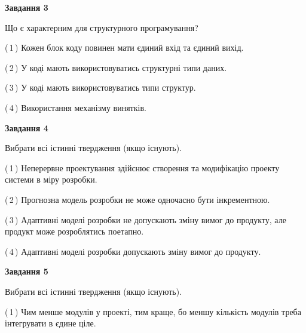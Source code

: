 \documentclass[10pt, ukrainian]{article}
\begin{document}
{\begin {large}
{\begin {center}\textbf{Завдання 3}\end {center}}\par
Що є характерним для структурного програмування?\par
\vspace{2mm}



(\,1\,) Кожен блок коду повинен мати єдиний вхід та єдиний вихід.%



(\,2\,) У коді мають використовуватись структурні типи даних. %



(\,3\,) У коді мають використовуватись типи структур. %



(\,4\,) Використання механізму винятків. %


{\begin {center}\textbf{Завдання 4}\end {center}}\par
Вибрати всі істинні твердження (якщо існують).\par
\vspace{2mm}



(\,1\,) Неперервне проектування здійснює створення та модифікацію проекту системи в міру розробки. %



(\,2\,) Прогнозна модель розробки не може одночасно бути інкрементною. %



(\,3\,) Адаптивні моделі розробки не допускають зміну вимог до продукту, але продукт може розроблятись поетапно. %



(\,4\,) Адаптивні моделі розробки допускають зміну вимог до продукту. %


{\begin {center}\textbf{Завдання 5}\end {center}}\par
Вибрати всі істинні твердження (якщо існують).\par
\vspace{2mm}



(\,1\,) Чим менше модулів у проекті, тим краще, бо меншу кількість модулів треба інтегрувати в єдине ціле. %




\end{large}}
\end{document}
